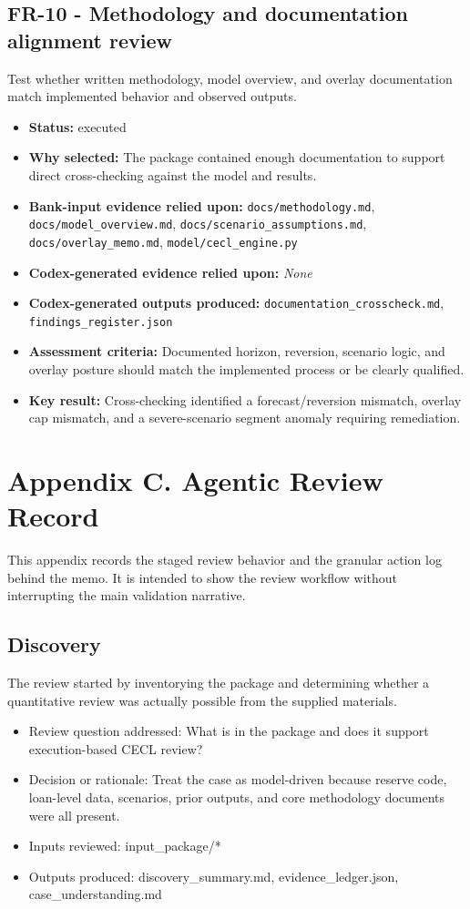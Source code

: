 \documentclass[11pt]{article}
\begin{document}
\subsection*{FR-10 - Methodology and documentation alignment review}
Test whether written methodology, model overview, and overlay documentation match implemented behavior and observed outputs.
\begin{itemize}
\item \textbf{Status:} executed
\item \textbf{Why selected:} The package contained enough documentation to support direct cross-checking against the model and results.
\item \textbf{Bank-input evidence relied upon:} \texttt{docs/methodology.md}, \texttt{docs/model\_overview.md}, \texttt{docs/scenario\_assumptions.md}, \texttt{docs/overlay\_memo.md}, \texttt{model/cecl\_engine.py}
\item \textbf{Codex-generated evidence relied upon:} \textit{None}
\item \textbf{Codex-generated outputs produced:} \texttt{documentation\_crosscheck.md}, \texttt{findings\_register.json}
\item \textbf{Assessment criteria:} Documented horizon, reversion, scenario logic, and overlay posture should match the implemented process or be clearly qualified.
\item \textbf{Key result:} Cross-checking identified a forecast/reversion mismatch, overlay cap mismatch, and a severe-scenario segment anomaly requiring remediation.
\end{itemize}
\section*{Appendix C. Agentic Review Record}
This appendix records the staged review behavior and the granular action log behind the memo. It is intended to show the review workflow without interrupting the main validation narrative.
\subsection*{Discovery}
The review started by inventorying the package and determining whether a quantitative review was actually possible from the supplied materials.
\begin{itemize}
\item Review question addressed: What is in the package and does it support execution-based CECL review?
\item Decision or rationale: Treat the case as model-driven because reserve code, loan-level data, scenarios, prior outputs, and core methodology documents were all present.
\item Inputs reviewed: input\_package/*
\item Outputs produced: discovery\_summary.md, evidence\_ledger.json, case\_understanding.md
\end{itemize}
\end{document}

